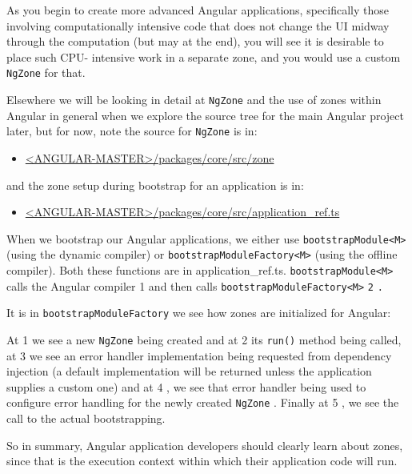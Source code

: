 As you begin to create more advanced Angular applications, specifically those
involving computationally intensive code that does not change the UI midway through
the computation (but may at the end), you will see it is desirable to place such CPU-
intensive work in a separate zone, and you would use a custom
\texttt{NgZone}
for that.

Elsewhere we will be looking in detail at
\texttt{NgZone}
and the use of zones within Angular in
general when we explore the source tree for the main Angular project later, but for
now, note the source for
\texttt{NgZone}
is in:

\begin{itemize}
  \item \href{https://github.com/angular/angular/tree/master/packages/core/src/zone}
        {<ANGULAR-MASTER>/packages/core/src/zone}
\end{itemize}

and the zone setup during bootstrap for an application is in:

\begin{itemize}
  \item \href{https://github.com/angular/angular/blob/master/packages/core/src/application_ref.ts}
        {<ANGULAR-MASTER>/packages/core/src/application\_ref.ts}
\end{itemize}

When we bootstrap our Angular applications, we either use
\texttt{bootstrapModule<M>}
(using the dynamic compiler) or
\texttt{bootstrapModuleFactory<M>}
(using the offline
compiler). Both these functions are in application\_ref.ts.
\texttt{bootstrapModule<M>}
calls
the Angular compiler
1
and then calls
\texttt{bootstrapModuleFactory<M>}
\texttt{2}
\texttt{.}



It is in
\texttt{bootstrapModuleFactory}
we see how zones are initialized for Angular:



At
1
we see a new
\texttt{NgZone}
being created and at
2
its
\texttt{run()}
method being called, at
3
we see an error handler implementation being requested from dependency injection (a
default implementation will be returned unless the application supplies a custom one)
and at
4
, we see that error handler being used to configure error handling for the
newly created
\texttt{NgZone}
. Finally at
5
, we see the call to the actual bootstrapping.

So in summary, Angular application developers should clearly learn about zones, since
that is the execution context within which their application code will run.

